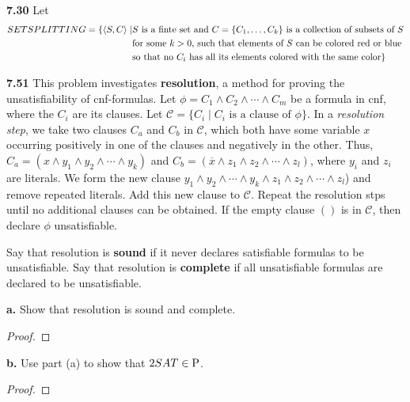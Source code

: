 \textbf{7.30} Let 
\begin{align*}
SETSPLITTING = \{ \desc{ S, C} \mid & S \text{ is a finte set and } C = \{ C_1, \ldots, C_k \} \text{ is a collection of subsets of $S$} \\
& \text{for some $k > 0$, such that elements of $S$ can be colored red or blue} \\ 
& \text{so that no $C_i$ has all its elements colored with the same color}\}
\end{align*}

\textbf{7.51} This problem investigates \textbf{resolution}, a method for proving the unsatisfiability of cnf-formulas. Let $\phi = C_1 \wedge C_2 \wedge \cdots \wedge C_m$ be a formula in cnf, where the $C_i$ are its clauses. Let $\mathcal{C} = \{ C_i \mid C_i \text{ is a clause of $\phi$} \}$. In a \textit{resolution step}, we take two clauses $C_a$ and $C_b$ in $\mathcal{C}$, which both have some variable $x$ occurring positively in one of the clauses and negatively in the other. Thus, $C_a = (x \wedge y_1 \wedge y_2 \wedge \cdots \wedge y_k)$ and $C_b = (\overline{x} \wedge z_1 \wedge z_2 \wedge \cdots \wedge z_l)$, where $y_i$ and $z_i$ are literals. We form the new clause $y_1 \wedge y_2 \wedge \cdots \wedge y_k \wedge z_1 \wedge z_2 \wedge \cdots \wedge z_l$) and remove repeated literals. Add this new clause to $\mathcal{C}$. Repeat the resolution stps until no additional clauses can be obtained. If the empty clause $()$ is in $\mathcal{C}$, then declare $\phi$ unsatisfiable. 

Say that resolution is \textbf{sound} if it never declares satisfiable formulas to be unsatisfiable. Say that resolution is \textbf{complete} if all unsatisfiable formulas are declared to be unsatisfiable.

\textbf{a.} Show that resolution is sound and complete.
\begin{mdframed}
\begin{proof}

\end{proof}
\end{mdframed}

\textbf{b.} Use part (a) to show that $2SAT \in \P$.
\begin{mdframed}
\begin{proof}

\end{proof}
\end{mdframed}